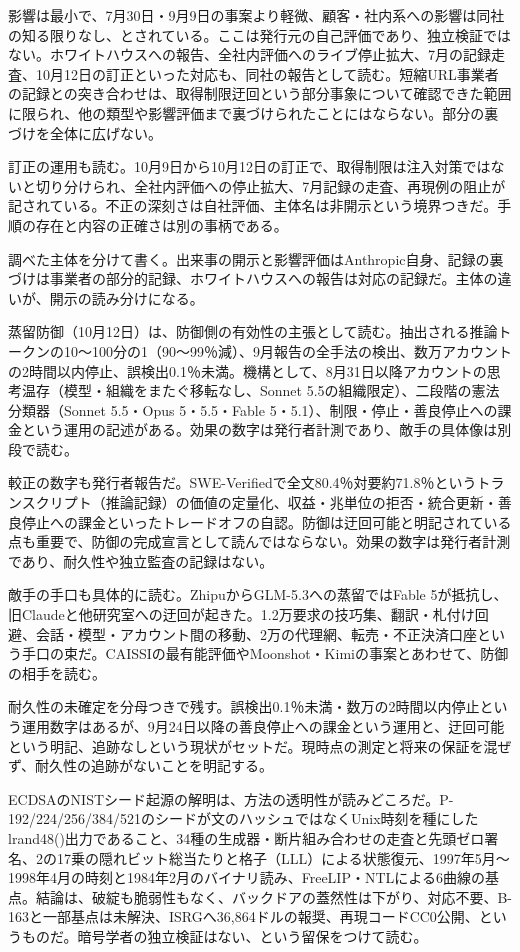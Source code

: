 \documentclass[lualatex,a4paper,10pt]{jlreq}
\begin{document}
影響は最小で、7月30日・9月9日の事案より軽微、顧客・社内系への影響は同社の知る限りなし、とされている。ここは発行元の自己評価であり、独立検証ではない。ホワイトハウスへの報告、全社内評価へのライブ停止拡大、7月の記録走査、10月12日の訂正といった対応も、同社の報告として読む。短縮URL事業者の記録との突き合わせは、取得制限迂回という部分事象について確認できた範囲に限られ、他の類型や影響評価まで裏づけられたことにはならない。部分の裏づけを全体に広げない。
\cite{B40,B79}


訂正の運用も読む。10月9日から10月12日の訂正で、取得制限は注入対策ではないと切り分けられ、全社内評価への停止拡大、7月記録の走査、再現例の阻止が記されている。不正の深刻さは自社評価、主体名は非開示という境界つきだ。手順の存在と内容の正確さは別の事柄である。
\cite{B40,B79}


調べた主体を分けて書く。出来事の開示と影響評価はAnthropic自身、記録の裏づけは事業者の部分的記録、ホワイトハウスへの報告は対応の記録だ。主体の違いが、開示の読み分けになる。
\cite{B40,B79}


蒸留防御（10月12日）は、防御側の有効性の主張として読む。抽出される推論トークンの10〜100分の1（90〜99％減）、9月報告の全手法の検出、数万アカウントの2時間以内停止、誤検出0.1％未満。機構として、8月31日以降アカウントの思考温存（模型・組織をまたぐ移転なし、Sonnet 5.5の組織限定）、二段階の憲法分類器（Sonnet 5.5・Opus 5・5.5・Fable 5・5.1）、制限・停止・善良停止への課金という運用の記述がある。効果の数字は発行者計測であり、敵手の具体像は別段で読む。
\cite{B41,B80}


較正の数字も発行者報告だ。SWE-Verifiedで全文80.4％対要約71.8％というトランスクリプト（推論記録）の価値の定量化、収益・兆単位の拒否・統合更新・善良停止への課金といったトレードオフの自認。防御は迂回可能と明記されている点も重要で、防御の完成宣言として読んではならない。効果の数字は発行者計測であり、耐久性や独立監査の記録はない。
\cite{B41,B80}


敵手の手口も具体的に読む。ZhipuからGLM-5.3への蒸留ではFable 5が抵抗し、旧Claudeと他研究室への迂回が起きた。1.2万要求の技巧集、翻訳・札付け回避、会話・模型・アカウント間の移動、2万の代理網、転売・不正決済口座という手口の束だ。CAISSIの最有能評価やMoonshot・Kimiの事案とあわせて、防御の相手を読む。
\cite{B41,B80}


耐久性の未確定を分母つきで残す。誤検出0.1％未満・数万の2時間以内停止という運用数字はあるが、9月24日以降の善良停止への課金という運用と、迂回可能という明記、追跡なしという現状がセットだ。現時点の測定と将来の保証を混ぜず、耐久性の追跡がないことを明記する。
\cite{B41,B80}


ECDSAのNISTシード起源の解明は、方法の透明性が読みどころだ。P-192/224/256/384/521のシードが文のハッシュではなくUnix時刻を種にしたlrand48()出力であること、34種の生成器・断片組み合わせの走査と先頭ゼロ署名、2の17乗の隠れビット総当たりと格子（LLL）による状態復元、1997年5月〜1998年4月の時刻と1984年2月のバイナリ読み、FreeLIP・NTLによる6曲線の基点。結論は、破綻も脆弱性もなく、バックドアの蓋然性は下がり、対応不要、B-163と一部基点は未解決、ISRGへ36,864ドルの報奨、再現コードCC0公開、というものだ。暗号学者の独立検証はない、という留保をつけて読む。
\cite{B42,B81}
\end{document}
